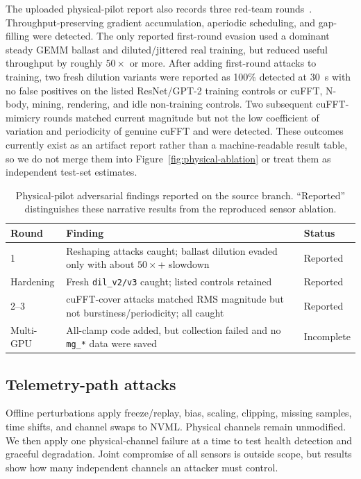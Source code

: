 \documentclass[sigplan,anonymous,review,nonacm]{acmart}
\begin{document}
The uploaded physical-pilot report also records three red-team rounds~\cite{rahman2026physical}. Throughput-preserving gradient accumulation, aperiodic scheduling, and gap-filling were detected. The only reported first-round evasion used a dominant steady GEMM ballast and diluted/jittered real training, but reduced useful throughput by roughly $50\times$ or more. After adding first-round attacks to training, two fresh dilution variants were reported as 100\% detected at 30~s with no false positives on the listed ResNet/GPT-2 training controls or cuFFT, N-body, mining, rendering, and idle non-training controls. Two subsequent cuFFT-mimicry rounds matched current magnitude but not the low coefficient of variation and periodicity of genuine cuFFT and were detected. These outcomes currently exist as an artifact report rather than a machine-readable result table, so we do not merge them into Figure~\ref{fig:physical-ablation} or treat them as independent test-set estimates.

\begin{table}[t]
\centering
\caption{Physical-pilot adversarial findings reported on the source branch. ``Reported'' distinguishes these narrative results from the reproduced sensor ablation.}
\label{tab:physical-redteam}
\scriptsize
\begin{tabularx}{\columnwidth}{p{1.8cm}Xp{1.55cm}}
\toprule
Round & Finding & Status \\
\midrule
1 & Reshaping attacks caught; ballast dilution evaded only with about $50\times$+ slowdown & Reported \\
Hardening & Fresh \texttt{dil\_v2/v3} caught; listed controls retained & Reported \\
2--3 & cuFFT-cover attacks matched RMS magnitude but not burstiness/periodicity; all caught & Reported \\
Multi-GPU & All-clamp code added, but collection failed and no \texttt{mg\_*} data were saved & Incomplete \\
\bottomrule
\end{tabularx}
\end{table}

\subsection{Telemetry-path attacks}

Offline perturbations apply freeze/replay, bias, scaling, clipping, missing samples, time shifts, and channel swaps to NVML. Physical channels remain unmodified. We then apply one physical-channel failure at a time to test health detection and graceful degradation. Joint compromise of all sensors is outside scope, but results show how many independent channels an attacker must control.
\end{document}

